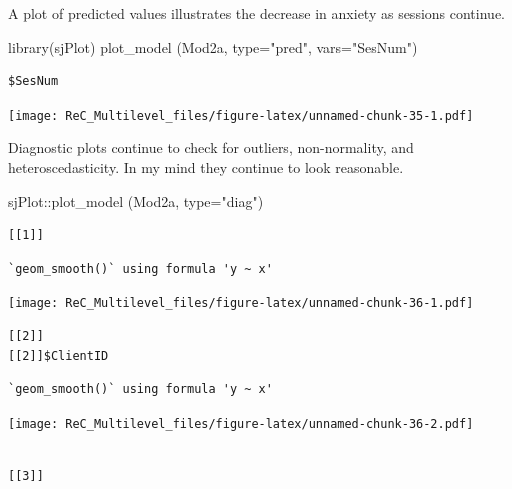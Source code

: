 \documentclass[
  english,
]{book}
\newenvironment{Shaded}{\begin{snugshade}}{\end{snugshade}}
\newcommand{\AttributeTok}[1]{\textcolor[rgb]{0.77,0.63,0.00}{#1}}
\newcommand{\FunctionTok}[1]{\textcolor[rgb]{0.00,0.00,0.00}{#1}}
\newcommand{\NormalTok}[1]{#1}
\newcommand{\SpecialCharTok}[1]{\textcolor[rgb]{0.00,0.00,0.00}{#1}}
\newcommand{\StringTok}[1]{\textcolor[rgb]{0.31,0.60,0.02}{#1}}
\begin{document}
A plot of predicted values illustrates the decrease in anxiety as sessions continue.

\begin{Shaded}
\begin{Highlighting}[]
\FunctionTok{library}\NormalTok{(sjPlot)}
\FunctionTok{plot\_model}\NormalTok{ (Mod2a, }\AttributeTok{type=}\StringTok{"pred"}\NormalTok{, }\AttributeTok{vars=}\StringTok{"SesNum"}\NormalTok{)}
\end{Highlighting}
\end{Shaded}

\begin{verbatim}
$SesNum
\end{verbatim}

\texttt{[image: ReC\_Multilevel\_files/figure-latex/unnamed-chunk-35-1.pdf]}

Diagnostic plots continue to check for outliers, non-normality, and heteroscedasticity. In my mind they continue to look reasonable.

\begin{Shaded}
\begin{Highlighting}[]
\NormalTok{sjPlot}\SpecialCharTok{::}\FunctionTok{plot\_model}\NormalTok{ (Mod2a, }\AttributeTok{type=}\StringTok{"diag"}\NormalTok{)}
\end{Highlighting}
\end{Shaded}

\begin{verbatim}
[[1]]
\end{verbatim}

\begin{verbatim}
`geom_smooth()` using formula 'y ~ x'
\end{verbatim}

\texttt{[image: ReC\_Multilevel\_files/figure-latex/unnamed-chunk-36-1.pdf]}

\begin{verbatim}
[[2]]
[[2]]$ClientID
\end{verbatim}

\begin{verbatim}
`geom_smooth()` using formula 'y ~ x'
\end{verbatim}

\texttt{[image: ReC\_Multilevel\_files/figure-latex/unnamed-chunk-36-2.pdf]}

\begin{verbatim}

[[3]]
\end{verbatim}
\end{document}
